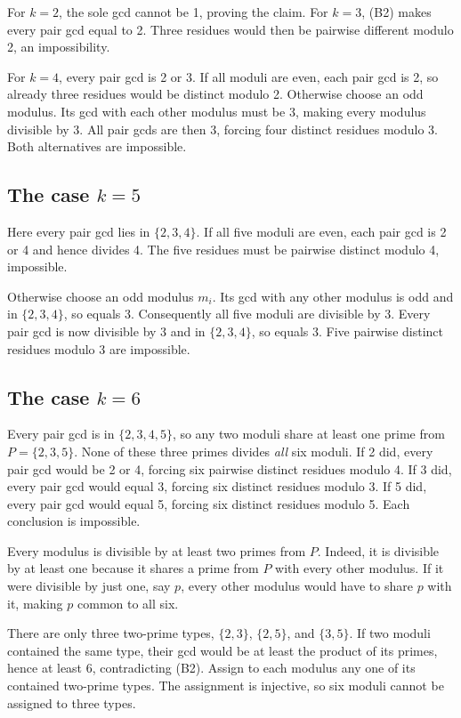 \documentclass[11pt,a4paper]{article}
\begin{document}
For \(k=2\), the sole gcd cannot be 1, proving the claim. For \(k=3\), (B2) makes every pair gcd equal to 2. Three residues would then be pairwise different modulo 2, an impossibility.

For \(k=4\), every pair gcd is 2 or 3. If all moduli are even, each pair gcd is 2, so already three residues would be distinct modulo 2. Otherwise choose an odd modulus. Its gcd with each other modulus must be 3, making every modulus divisible by 3. All pair gcds are then 3, forcing four distinct residues modulo 3. Both alternatives are impossible.

\subsection{\texorpdfstring{The case \(k=5\)}{The case k=5}}\label{the-case-k5}

Here every pair gcd lies in \(\{2,3,4\}\). If all five moduli are even, each pair gcd is 2 or 4 and hence divides 4. The five residues must be pairwise distinct modulo 4, impossible.

Otherwise choose an odd modulus \(m_i\). Its gcd with any other modulus is odd and in \(\{2,3,4\}\), so equals 3. Consequently all five moduli are divisible by 3. Every pair gcd is now divisible by 3 and in \(\{2,3,4\}\), so equals 3. Five pairwise distinct residues modulo 3 are impossible.

\subsection{\texorpdfstring{The case \(k=6\)}{The case k=6}}\label{the-case-k6}

Every pair gcd is in \(\{2,3,4,5\}\), so any two moduli share at least one prime from \(P=\{2,3,5\}\). None of these three primes divides \emph{all} six moduli. If 2 did, every pair gcd would be 2 or 4, forcing six pairwise distinct residues modulo 4. If 3 did, every pair gcd would equal 3, forcing six distinct residues modulo 3. If 5 did, every pair gcd would equal 5, forcing six distinct residues modulo 5. Each conclusion is impossible.

Every modulus is divisible by at least two primes from \(P\). Indeed, it is divisible by at least one because it shares a prime from \(P\) with every other modulus. If it were divisible by just one, say \(p\), every other modulus would have to share \(p\) with it, making \(p\) common to all six.

There are only three two-prime types, \(\{2,3\}\), \(\{2,5\}\), and \(\{3,5\}\). If two moduli contained the same type, their gcd would be at least the product of its primes, hence at least 6, contradicting (B2). Assign to each modulus any one of its contained two-prime types. The assignment is injective, so six moduli cannot be assigned to three types.
\end{document}
